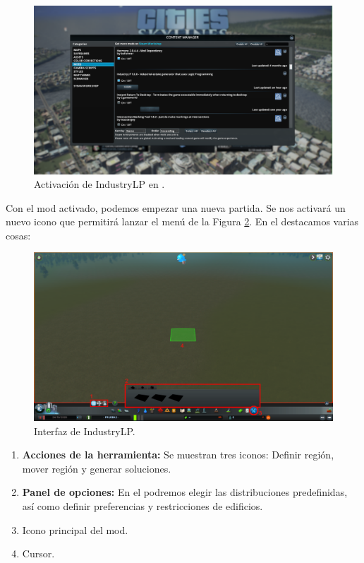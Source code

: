 \begin{figure}[h]
	\centering
	\includegraphics[width=\textwidth]{images/options}
	\caption{Activación de IndustryLP en \cities.}
	\label{fig:options}
\end{figure}

Con el mod activado, podemos empezar una nueva partida. Se nos activará un nuevo icono que permitirá lanzar el menú de la Figura \ref{fig:tool}. En el destacamos varias cosas:

\begin{figure}[h]
	\centering
	\includegraphics[width=\textwidth]{images/tool}
	\caption{Interfaz de IndustryLP.}
	\label{fig:tool}
\end{figure}

\begin{enumerate}
    \item \textbf{Acciones de la herramienta:} Se muestran tres iconos: Definir región, mover región y generar soluciones.
    \item \textbf{Panel de opciones:} En el podremos elegir las distribuciones predefinidas, así como definir preferencias y restricciones de edificios.
    \item Icono principal del mod.
    \item Cursor.
\end{enumerate}

